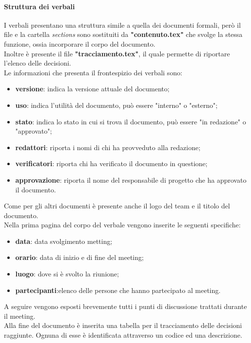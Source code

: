 \paragraph{Struttura dei verbali} 
I verbali presentano una struttura simile a quella dei documenti formali, però il file e la cartella \textit{sections} sono sostituiti da \textbf{"contenuto.tex"} che svolge la stessa funzione, ossia incorporare il corpo del documento.\\
Inoltre è presente il file \textbf{"tracciamento.tex"}, il quale permette di riportare l'elenco delle decisioni.\\
Le informazioni che presenta il frontespizio dei verbali sono:
\begin{itemize}
	\item\textbf{versione}: indica la versione attuale del documento;
	\item\textbf{uso}: indica l'utilità del documento, può essere "interno" o "esterno";
	\item\textbf{stato}: indica lo stato in cui si trova il documento, può essere "in redazione" o "approvato";
	\item\textbf{redattori}: riporta i nomi di chi ha provveduto alla redazione;
	\item\textbf{verificatori}: riporta chi ha verificato il documento in questione;
	\item\textbf{approvazione}: riporta il nome del responsabile di progetto che ha approvato il documento.
\end{itemize}
Come per gli altri documenti è presente anche il logo del team e il titolo del documento.\\
Nella prima pagina del corpo del verbale vengono inserite le seguenti specifiche:
\begin{itemize}
    \item\textbf{data}: data svolgimento metting;
    \item\textbf{orario}: data di inizio e di fine del meeting;
    \item\textbf{luogo}: dove si è svolto la riunione;
    \item\textbf{partecipanti}:elenco delle persone che hanno partecipato al meeting.
\end{itemize}
A seguire vengono esposti brevemente tutti i punti di discussione trattati durante il meeting.\\
Alla fine del documento è inserita una tabella per il tracciamento delle decisioni raggiunte. Ognuna di esse è identificata attraverso un codice ed una descrizione.\\
